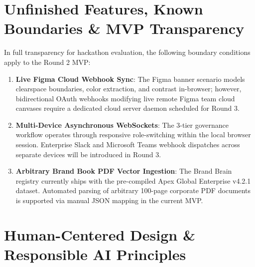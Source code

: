 \documentclass[10pt,a4paper]{article}
\begin{document}
\section{Unfinished Features, Known Boundaries \& MVP Transparency}
In full transparency for hackathon evaluation, the following boundary conditions apply to the Round 2 MVP:
\begin{enumerate}[leftmargin=*,itemsep=1.5pt,topsep=1pt]
  \item \textbf{Live Figma Cloud Webhook Sync}: The Figma banner scenario models clearspace boundaries, color extraction, and contrast in-browser; however, bidirectional OAuth webhooks modifying live remote Figma team cloud canvases require a dedicated cloud server daemon scheduled for Round 3.
  \item \textbf{Multi-Device Asynchronous WebSockets}: The 3-tier governance workflow operates through responsive role-switching within the local browser session. Enterprise Slack and Microsoft Teams webhook dispatches across separate devices will be introduced in Round 3.
  \item \textbf{Arbitrary Brand Book PDF Vector Ingestion}: The Brand Brain registry currently ships with the pre-compiled Apex Global Enterprise v4.2.1 dataset. Automated parsing of arbitrary 100-page corporate PDF documents is supported via manual JSON mapping in the current MVP.
\end{enumerate}

\vspace{-0.25cm}
\section{Human-Centered Design \& Responsible AI Principles}

\begin{center}
\end{center}
\end{document}
